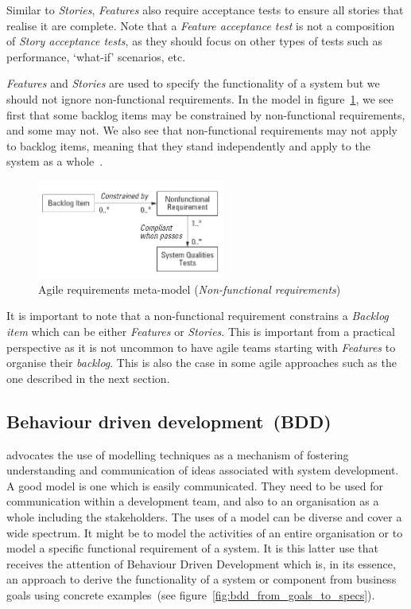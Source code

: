 \documentclass[dissertation,final]{softeng}
\begin{document}
Similar to \emph{Stories}, \emph{Features} also require acceptance tests to ensure all stories that realise it are complete. Note that a \emph{Feature acceptance test} is not a composition of \emph{Story acceptance tests}, as they should focus on other types of tests such as performance, `what-if' scenarios, etc. 

\emph{Features} and \emph{Stories} are used to specify the functionality of a system but we should not ignore non-functional requirements. In the model in figure~\ref{fig:metamodel_nfrs}, we see first that some backlog items may be constrained by non-functional requirements, and some may not. We also see that non-functional requirements may not apply to backlog items, meaning that they stand independently and apply to the system as a whole~\citep{Leffingwell2011}.

\begin{figure}[h]
\includegraphics[width=0.55\textwidth]{metamodel_nfrs}
\centering
\caption{Agile requirements meta-model (\emph{Non-functional requirements})}
\label{fig:metamodel_nfrs}
\end{figure}

It is important to note that a non-functional requirement constrains a \emph{Backlog item} which can be either \emph{Features} or \emph{Stories}. This is important from a practical perspective as it is not uncommon to have agile teams starting with \emph{Features} to organise their \emph{backlog}. This is also the case in some agile approaches such as the one described in the next section.

\subsection{Behaviour driven development~(BDD)}
\label{ch:Background:sec:bdd}
\citet{Hull2011} advocates the use of modelling techniques as a mechanism of fostering understanding and communication of ideas associated with system development. A good model is one which is easily communicated. They need to be used for communication within a development team, and also to an organisation as a whole including the stakeholders. The uses of a model can be diverse and cover a wide spectrum. It might be to model the activities of an entire organisation or to model a specific functional requirement of a system. It is this latter use that receives the attention of Behaviour Driven Development which is, in its essence, an approach to derive the functionality of a system or component from business goals using concrete examples~(see figure~\ref{fig:bdd_from_goals_to_specs}).
\end{document}
